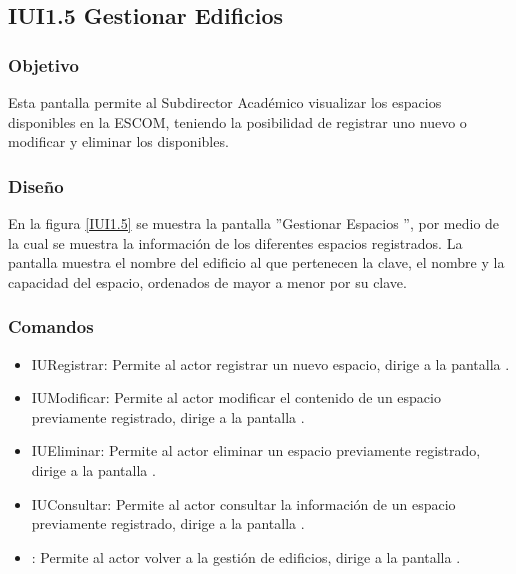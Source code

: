 \subsection{IUI1.5 Gestionar Edificios}

\subsubsection{Objetivo}
	
Esta pantalla permite al Subdirector Académico visualizar los espacios disponibles en la ESCOM, teniendo la posibilidad de registrar uno nuevo o modificar y eliminar los disponibles.

\subsubsection{Diseño}

    En la figura \ref{IUI1.5} se muestra la pantalla ''Gestionar Espacios '', por medio de la cual se muestra la información de los diferentes espacios registrados. La pantalla muestra el nombre del edificio al que pertenecen la clave, el nombre y la capacidad del espacio, ordenados de mayor a menor por su clave.
 

\subsubsection{Comandos}
    \begin{itemize}
	\item IURegistrar: Permite al actor registrar un nuevo espacio, dirige a la pantalla .
	
	\item IUModificar: Permite al actor modificar el contenido de un espacio previamente registrado, dirige a la pantalla .
	
	\item IUEliminar: Permite al actor eliminar un espacio previamente registrado, dirige a la pantalla .

	\item IUConsultar: Permite al actor consultar la información de un espacio previamente registrado, dirige a la pantalla .

	\item {}: Permite al actor volver a la gestión de edificios, dirige a la pantalla .

	
    \end{itemize}
